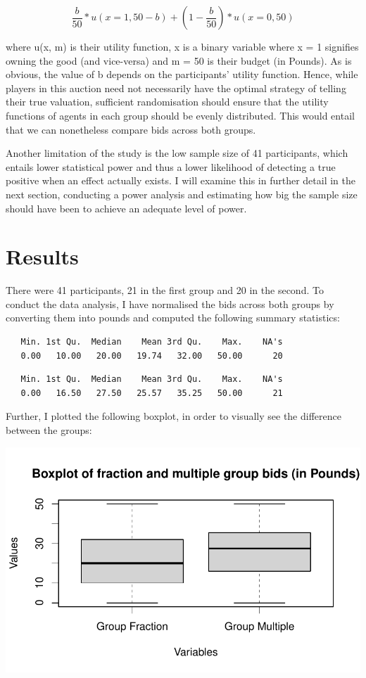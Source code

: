 \documentclass[
]{report}
\begin{document}
\[\frac{b}{50} * u(x = 1, 50 - b) + (1 - \frac{b}{50}) * u(x = 0, 50)\]

where u(x, m) is their utility function, x is a binary variable where x
= 1 signifies owning the good (and vice-versa) and m = 50 is their
budget (in Pounds). As is obvious, the value of b depends on the
participants' utility function. Hence, while players in this auction
need not necessarily have the optimal strategy of telling their true
valuation, sufficient randomisation should ensure that the utility
functions of agents in each group should be evenly distributed. This
would entail that we can nonetheless compare bids across both groups.

Another limitation of the study is the low sample size of 41
participants, which entails lower statistical power and thus a lower
likelihood of detecting a true positive when an effect actually exists.
I will examine this in further detail in the next section, conducting a
power analysis and estimating how big the sample size should have been
to achieve an adequate level of power.

\chapter{Results}\label{results}

There were 41 participants, 21 in the first group and 20 in the second.
To conduct the data analysis, I have normalised the bids across both
groups by converting them into pounds and computed the following summary
statistics:

\begin{verbatim}
   Min. 1st Qu.  Median    Mean 3rd Qu.    Max.    NA's 
   0.00   10.00   20.00   19.74   32.00   50.00      20 
\end{verbatim}

\begin{verbatim}
   Min. 1st Qu.  Median    Mean 3rd Qu.    Max.    NA's 
   0.00   16.50   27.50   25.57   35.25   50.00      21 
\end{verbatim}

Further, I plotted the following boxplot, in order to visually see the
difference between the groups:

\includegraphics{paper_files/figure-pdf/unnamed-chunk-2-1.pdf}
\end{document}
